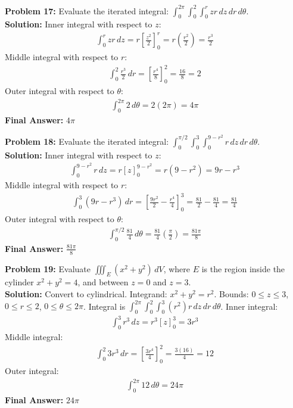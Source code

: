 \documentclass[12pt]{article}
\begin{document}
\textbf{Problem 17:} Evaluate the iterated integral: $\int_0^{2\pi} \int_0^2 \int_0^{r} z r \, dz \, dr \, d\theta$.
\\
\textbf{Solution:} Inner integral with respect to $z$:
\begin{align*}
\int_0^r z r \, dz = r \left[ \frac{z^2}{2} \right]_0^r = r \left( \frac{r^2}{2} \right) = \frac{r^3}{2}
\end{align*}
Middle integral with respect to $r$:
\begin{align*}
\int_0^2 \frac{r^3}{2} \, dr = \left[ \frac{r^4}{8} \right]_0^2 = \frac{16}{8} = 2
\end{align*}
Outer integral with respect to $\theta$:
\begin{align*}
\int_0^{2\pi} 2 \, d\theta = 2(2\pi) = 4\pi
\end{align*}
\textbf{Final Answer:} $4\pi$
\vspace{0.5cm}

\textbf{Problem 18:} Evaluate the iterated integral: $\int_0^{\pi/2} \int_0^3 \int_0^{9-r^2} r \, dz \, dr \, d\theta$.
\\
\textbf{Solution:} Inner integral with respect to $z$:
\begin{align*}
\int_0^{9-r^2} r \, dz = r[z]_0^{9-r^2} = r(9-r^2) = 9r - r^3
\end{align*}
Middle integral with respect to $r$:
\begin{align*}
\int_0^3 (9r - r^3) \, dr = \left[ \frac{9r^2}{2} - \frac{r^4}{4} \right]_0^3 = \frac{81}{2} - \frac{81}{4} = \frac{81}{4}
\end{align*}
Outer integral with respect to $\theta$:
\begin{align*}
\int_0^{\pi/2} \frac{81}{4} \, d\theta = \frac{81}{4} \left(\frac{\pi}{2}\right) = \frac{81\pi}{8}
\end{align*}
\textbf{Final Answer:} $\frac{81\pi}{8}$
\vspace{0.5cm}

\textbf{Problem 19:} Evaluate $\iiint_E (x^2+y^2) \, dV$, where $E$ is the region inside the cylinder $x^2+y^2=4$, and between $z=0$ and $z=3$.
\\
\textbf{Solution:} Convert to cylindrical. Integrand: $x^2+y^2 = r^2$. Bounds: $0 \le z \le 3$, $0 \le r \le 2$, $0 \le \theta \le 2\pi$. Integral is $\int_0^{2\pi} \int_0^2 \int_0^3 (r^2) r \, dz \, dr \, d\theta$.
Inner integral:
\begin{align*}
\int_0^3 r^3 \, dz = r^3[z]_0^3 = 3r^3
\end{align*}
Middle integral:
\begin{align*}
\int_0^2 3r^3 \, dr = \left[ \frac{3r^4}{4} \right]_0^2 = \frac{3(16)}{4} = 12
\end{align*}
Outer integral:
\begin{align*}
\int_0^{2\pi} 12 \, d\theta = 24\pi
\end{align*}
\textbf{Final Answer:} $24\pi$
\vspace{0.5cm}
\end{document}
